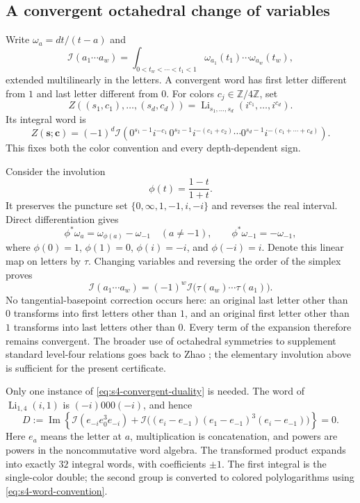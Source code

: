 \subsection{A convergent octahedral change of variables}
Write $\omega_a=dt/(t-a)$ and
\[
 \mathcal I(a_1\cdots a_w)
 =\int_{0<t_w<\cdots<t_1<1}
     \omega_{a_1}(t_1)\cdots\omega_{a_w}(t_w),
\]
extended multilinearly in the letters. A convergent word has first letter
different from $1$ and last letter different from $0$.
For colors $c_j\in\mathbb Z/4\mathbb Z$, set
\[
 Z((s_1,c_1),\ldots,(s_d,c_d))
 =\operatorname{Li}_{s_1,\ldots,s_d}(i^{c_1},\ldots,i^{c_d}).
\]
Its integral word is
\begin{equation}\label{eq:s4-word-convention}
 Z(\boldsymbol s;\boldsymbol c)
 =(-1)^d\mathcal I\left(
 0^{s_1-1}i^{-c_1}\,
 0^{s_2-1}i^{-(c_1+c_2)}\cdots
 0^{s_d-1}i^{-(c_1+\cdots+c_d)}\right).
\end{equation}
This fixes both the color convention and every depth-dependent sign.

Consider the involution
\[
 \phi(t)=\frac{1-t}{1+t}.
\]
It preserves the puncture set $\{0,\infty,1,-1,i,-i\}$ and reverses the
real interval. Direct differentiation gives
\[
 \phi^*\omega_a=\omega_{\phi(a)}-\omega_{-1}\quad(a\ne-1),
 \qquad \phi^*\omega_{-1}=-\omega_{-1},
\]
where $\phi(0)=1$, $\phi(1)=0$, $\phi(i)=-i$, and
$\phi(-i)=i$. Denote this linear map on letters by $\tau$.
Changing variables and reversing the order of the simplex proves
\begin{equation}\label{eq:s4-convergent-duality}
 \mathcal I(a_1\cdots a_w)
 =(-1)^w\mathcal I\bigl(\tau(a_w)\cdots\tau(a_1)\bigr).
\end{equation}
No tangential-basepoint correction occurs here: an original last letter
other than $0$ transforms into first letters other than $1$, and an original
first letter other than $1$ transforms into last letters other than $0$.
Every term of the expansion therefore remains convergent.
The broader use of octahedral symmetries to supplement standard level-four
relations goes back to Zhao \cite{jqzhao2008,jqzhao2010}; the elementary
involution above is sufficient for the present certificate.

Only one instance of \eqref{eq:s4-convergent-duality} is needed. The word of
$\operatorname{Li}_{1,4}(i,1)$ is $(-i)000(-i)$, and hence
\begin{equation}\label{eq:s4-duality-seed}
 D:=\operatorname{Im}\left\{
 \mathcal I(e_{-i}e_0^3e_{-i})+
 \mathcal I\bigl((e_i-e_{-1})(e_1-e_{-1})^3(e_i-e_{-1})\bigr)\right\}=0.
\end{equation}
Here $e_a$ means the letter at $a$, multiplication is concatenation, and
powers are powers in the noncommutative word algebra. The transformed product expands into
exactly $32$ integral words, with coefficients $\pm1$. The first integral is
the single-color double; the second group is converted to colored
polylogarithms using \eqref{eq:s4-word-convention}.

